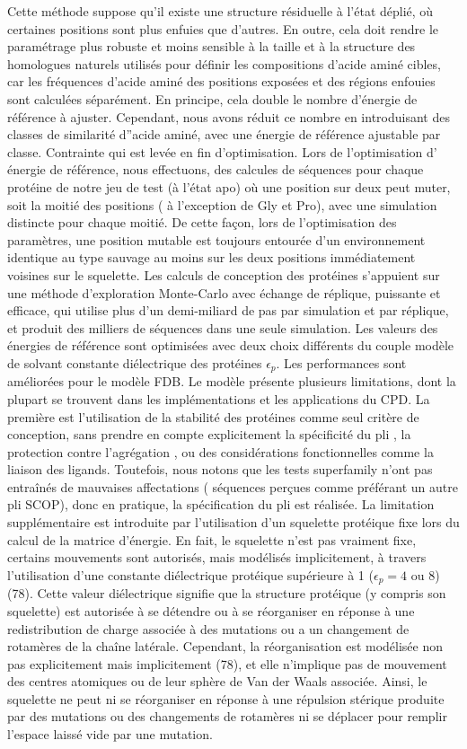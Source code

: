 Cette méthode suppose qu'il existe une structure résiduelle à l'état déplié, où certaines positions sont plus enfuies que d'autres. En outre, cela doit rendre le paramétrage plus robuste et moins sensible à la taille et à la structure des homologues naturels utilisés pour définir les compositions d'acide aminé cibles, car les fréquences d'acide aminé des positions exposées et des régions enfouies sont calculées séparément. En principe, cela double le nombre d'énergie de référence à ajuster. Cependant, nous avons réduit ce nombre en introduisant des classes de similarité d''acide aminé, avec une énergie de référence ajustable par classe. Contrainte qui est levée en fin d'optimisation. Lors de l'optimisation d’ énergie de référence, nous effectuons, des calcules de séquences pour chaque protéine de notre jeu de test (à l'état apo) où une position sur deux  peut muter, soit la moitié des positions ( à l'exception de Gly et Pro), avec une simulation distincte pour chaque moitié. De cette façon, lors de l'optimisation des paramètres, une position mutable est toujours entourée d'un environnement  identique au type sauvage au moins sur les deux positions immédiatement voisines sur le squelette. Les calculs de conception des protéines s'appuient sur une méthode d'exploration Monte-Carlo avec échange de réplique, puissante et efficace, qui utilise plus d'un demi-miliard de pas par simulation et par réplique, et  produit des milliers de séquences dans une seule simulation. Les valeurs des énergies de référence sont optimisées avec deux choix différents du couple modèle de solvant constante diélectrique des protéines $\epsilon_p$. Les performances sont améliorées pour le modèle FDB.
Le modèle présente plusieurs limitations, dont la plupart se trouvent dans les implémentations et les applications du CPD. La première est l'utilisation de la stabilité des protéines comme seul critère de conception, sans prendre en compte explicitement la spécificité du pli \cite{Schmidt08,Simonson13}, la protection contre l'agrégation , ou des considérations fonctionnelles comme la liaison des ligands. Toutefois, nous notons que les tests superfamily n'ont pas entraînés de mauvaises affectations ( séquences perçues comme préférant un autre pli SCOP), donc en pratique, la spécification du pli est réalisée. La limitation supplémentaire est introduite  par l'utilisation d'un squelette protéique fixe lors du calcul de la matrice d'énergie. En fait, le squelette n'est pas vraiment fixe, certains mouvements sont autorisés, mais modélisés implicitement, à travers l'utilisation d'une constante diélectrique protéique supérieure à 1 ($\epsilon_p= 4$ ou 8) (78). Cette valeur diélectrique signifie que la structure protéique (y compris son squelette) est autorisée à se détendre ou à se réorganiser en réponse à une redistribution de charge associée à des mutations ou a un changement de rotamères de la chaîne latérale. Cependant, la réorganisation est modélisée non pas explicitement mais implicitement (78), et elle n'implique pas de mouvement des centres atomiques ou de leur sphère de Van der Waals associée. Ainsi, le squelette ne peut ni se réorganiser en réponse à une répulsion stérique produite par des mutations ou des changements de rotamères ni se déplacer pour remplir l'espace laissé vide par une mutation.  
